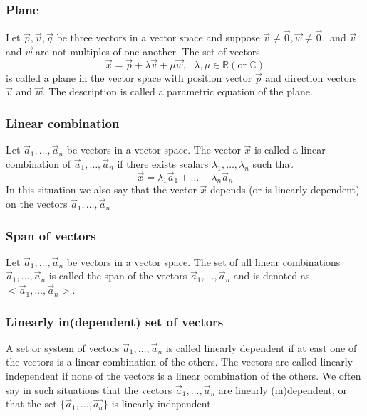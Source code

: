 \documentclass{article}
\begin{document}
			\subsubsection{Plane}
			Let $\vec{p}, \vec{v}, \vec{q}$ be three vectors in a vector space and suppose $\vec{v} \neq \vec{0}, \vec{w} \neq \vec{0},$ and $\vec{v}$ and $\vec{w}$ are not multiples of one another. The set of vectors
			\begin{equation*}
				\vec{x} = \vec{p} + \lambda\vec{v}+ \mu\vec{w},\text{ } \lambda, \mu \in \mathbb{R} (\text{or }\mathbb{C})
			\end{equation*}
			is called a plane in the vector space with position vector $\vec{p}$ and direction vectors $\vec{v}$ and $\vec{w}$. The description is called a parametric equation of the plane.
			
			\subsubsection{Linear combination}
			Let $\vec{a}_1,\dots,\vec{a}_n$ be vectors in a vector space. The vector $\vec{x}$ is called a linear combination of $\vec{a}_1,\dots,\vec{a}_n$ if there exists scalars $\lambda_1,\dots,\lambda_n$ such that
			\begin{equation*}
				\vec{x} = \lambda_1\vec{a}_1 + \dots + \lambda_n\vec{a}_n
			\end{equation*}
			In this situation we also say that the vector $\vec{x}$ depends (or is linearly dependent) on the vectors $\vec{a}_1,\dots,\vec{a}_n$
			
			\subsubsection{Span of vectors}
			Let $\vec{a}_1,\dots,\vec{a}_n$ be vectors in a vector space. The set of all linear combinations $\vec{a}_1,\dots,\vec{a}_n$ is called the span of the vectors $\vec{a}_1,\dots,\vec{a}_n$ and is denoted as $<\vec{a}_1,\dots,\vec{a}_n>$.
			
			\subsubsection{Linearly in(dependent) set of vectors}
			A set or system of vectors $\vec{a}_1,\dots,\vec{a}_n$ is called linearly dependent if at east one of the vectors is a linear combination of the others. The vectors are called linearly independent if none of the vectors is a linear combination of the others. We often say in such situations that the vectors $\vec{a}_1,\dots,\vec{a}_n$ are linearly (in)dependent, or that the set $\{\vec{a}_1,\dots,\vec{a_n}\}$ is linearly independent.
			
\end{document}
